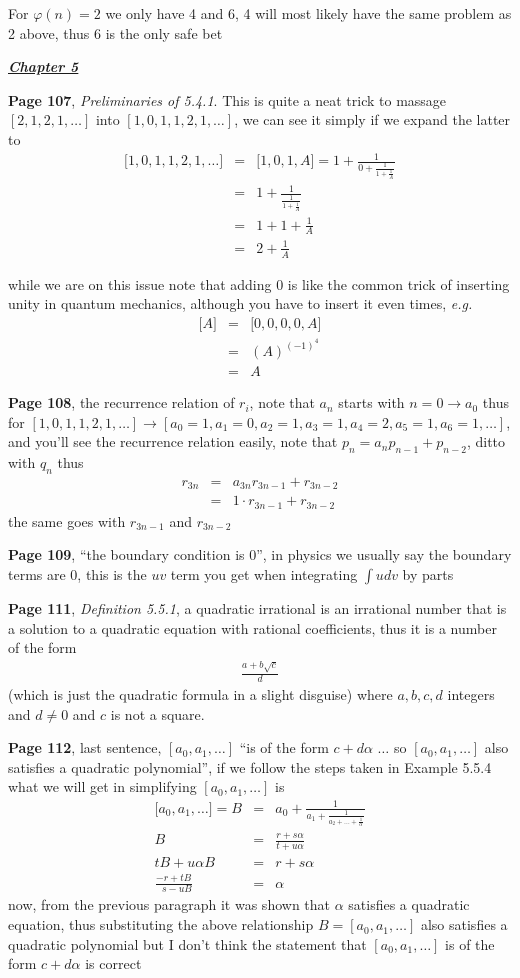 \documentclass[aps,preprint,preprintnumbers,nofootinbib,showpacs,prd]{revtex4-1}
\newcommand{\eg}{{\it e.g.} }
\newcommand{\nbea}{\begin{eqnarray*}}
\newcommand{\neea}{\end{eqnarray*}}
\begin{document}
For $\varphi(n)=2$ we only have 4 and 6, 4 will most likely have the same problem as 2 above, thus $6$ is the only safe bet

\bigskip
\underline{\textbf{\textit{Chapter 5}}}
\bigskip

{\bf Page 107}, {\it Preliminaries of 5.4.1}. This is quite a neat trick to massage $[2,1,2,1,\dots]$ into $[1,0,1,1,2,1,\dots]$, we can see it simply if we expand the latter to
%
\nbea
\lbrack 1,0,1,1,2,1,\dots\rbrack & = & \lbrack 1,0,1,A\rbrack = 1 + \frac{1}{0 + \frac{1}{1 + \frac{1}{A}}} \\
& = & 1 + \frac{1}{\frac{1}{1 + \frac{1}{A}}} \\
& = & 1 + 1 + \frac{1}{A} \\
& = & 2 + \frac{1}{A}
\neea
%

while we are on this issue note that adding $0$ is like the common trick of inserting unity in quantum mechanics, although you have to insert it even times, \eg
%
\nbea
\lbrack A \rbrack & = & \lbrack 0,0,0,0,A \rbrack \\
& = & (A)^{(-1)^4} \\
& = & A
\neea
%

{\bf Page 108}, the recurrence relation of $r_i$, note that $a_n$ starts with $n = 0 \to a_0$ thus for $[1,0,1,1,2,1,\dots] \to [a_0 = 1, a_1 = 0, a_2=1, a_3 = 1, a_4 = 2, a_5=1, a_6=1, \dots]$, and you'll see the recurrence relation easily, note that $p_n = a_np_{n-1} + p_{n-2}$, ditto with $q_n$ thus
%
\nbea
r_{3n} & = & a_{3n}r_{3n-1} + r_{3n-2} \\
& = & 1 \cdot r_{3n-1} + r_{3n-2}
\neea
%
the same goes with $r_{3n-1}$ and $r_{3n-2}$

{\bf Page 109}, ``the boundary condition is 0'', in physics we usually say the boundary terms are 0, this is the $uv$ term you get when integrating $\int udv$ by parts

{\bf Page 111}, {\it Definition 5.5.1}, a quadratic irrational is an irrational number that is a solution to a quadratic equation with rational coefficients, thus it is a number of the form
%
\nbea
\frac{a + b\sqrt{c}}{d}
\neea
%
(which is just the quadratic formula in a slight disguise) where $a,b,c,d$ integers and $d \neq 0$ and $c$ is not a square.

{\bf Page 112}, last sentence, $[a_0,a_1,\dots]$ ``is of the form $c + d\alpha$ $\dots$ so $[a_0,a_1,\dots]$ also satisfies a quadratic polynomial'', if we follow the steps taken in Example 5.5.4 what we will get in simplifying $[a_0,a_1,\dots]$ is
%
\nbea
\lbrack a_0,a_1,\dots\rbrack  = B & = & a_0 + \frac{1}{a_1 + \frac{1}{a_2 + \dots + \frac{1}{\alpha}}} \\
B & = & \frac{r + s\alpha}{t + u\alpha} \\
tB + u\alpha B & = & r + s\alpha \\
\frac{- r + tB}{~~~s -uB} & = & \alpha
\neea
% 
now, from the previous paragraph it was shown that $\alpha$ satisfies a quadratic equation, thus substituting the above relationship $B = [a_0,a_1,\dots]$ also satisfies a quadratic polynomial but I don't think the statement that $[a_0,a_1,\dots]$ is of the form $c + d\alpha$ is correct
\end{document}
